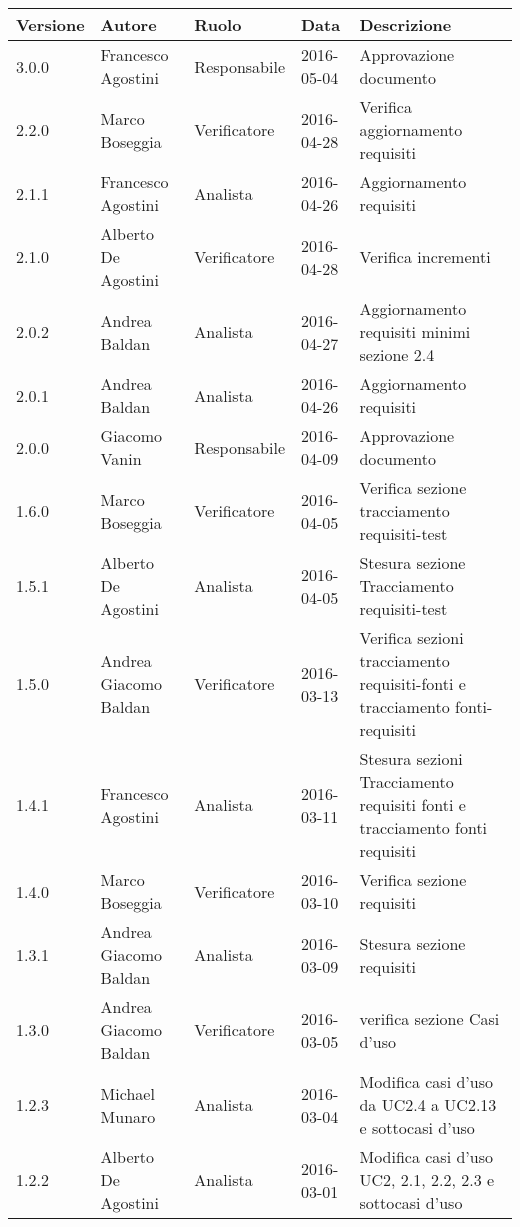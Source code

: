 \documentclass{scalatekids-article}
\begin{document}
\begin{center}
  \begin{longtable}{| l | l | l | l | p{5cm} |}
    \hline
    Versione & Autore & Ruolo & Data & Descrizione \\
    \hline
    3.0.0 & Francesco Agostini & Responsabile & 2016-05-04 & Approvazione documento\\
    \hline
    2.2.0 & Marco Boseggia & Verificatore & 2016-04-28 & Verifica aggiornamento requisiti \\
    \hline
    2.1.1 & Francesco Agostini & Analista & 2016-04-26 & Aggiornamento requisiti \\
    \hline
    2.1.0 & Alberto De Agostini & Verificatore & 2016-04-28 & Verifica incrementi \\
    \hline
    2.0.2 & Andrea Baldan & Analista & 2016-04-27 & Aggiornamento requisiti minimi sezione 2.4 \\
    \hline
    2.0.1 & Andrea Baldan & Analista & 2016-04-26 & Aggiornamento requisiti \\
    \hline
    2.0.0 & Giacomo Vanin & Responsabile & 2016-04-09 & Approvazione documento\\
    \hline
    1.6.0 & Marco Boseggia & Verificatore & 2016-04-05 & Verifica sezione tracciamento requisiti-test\\
    \hline
    1.5.1 & Alberto De Agostini & Analista & 2016-04-05 & Stesura sezione Tracciamento requisiti-test\\
    \hline
    1.5.0 & Andrea Giacomo Baldan & Verificatore & 2016-03-13 & Verifica sezioni tracciamento requisiti-fonti e tracciamento fonti-requisiti\\
    \hline
    1.4.1 & Francesco Agostini & Analista & 2016-03-11 & Stesura sezioni Tracciamento requisiti fonti e tracciamento fonti requisiti\\
    \hline
    1.4.0 & Marco Boseggia & Verificatore & 2016-03-10 & Verifica sezione requisiti\\
    \hline
    1.3.1 & Andrea Giacomo Baldan & Analista & 2016-03-09 & Stesura sezione requisiti\\
    \hline
    1.3.0 & Andrea Giacomo Baldan & Verificatore & 2016-03-05 & verifica sezione Casi d'uso\\
    \hline
    1.2.3 & Michael Munaro & Analista & 2016-03-04 & Modifica casi d'uso da UC2.4 a UC2.13 e sottocasi d'uso\\
    \hline
    1.2.2 & Alberto De Agostini & Analista & 2016-03-01 & Modifica casi d'uso UC2, 2.1, 2.2, 2.3 e sottocasi d'uso\\

\end{longtable}
\end{center}
\end{document}
